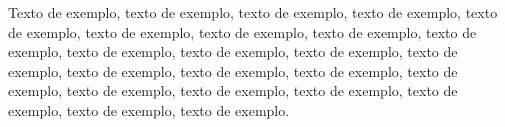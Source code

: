 \documentclass[
	12pt,				%
	oneside,			%
	a4paper,			%
	english,			%
	brazil				%
	]{abntex2ppgsi}
\begin{document}
Texto de exemplo, texto de exemplo, texto de exemplo, texto de exemplo, texto de exemplo, texto de exemplo, texto de exemplo, texto de exemplo, texto de exemplo, texto de exemplo, texto de exemplo, texto de exemplo, texto de exemplo, texto de exemplo, texto de exemplo, texto de exemplo, texto de exemplo, texto de exemplo, texto de exemplo, texto de exemplo, texto de exemplo, texto de exemplo, texto de exemplo.

\postextual



%
%

\end{document}
